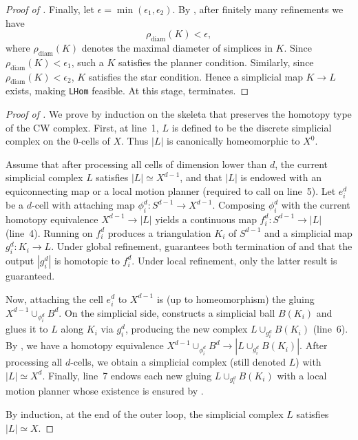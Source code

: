 \documentclass[a4paper,english,cleveref,autoref,thm-restate,nolineno]{socg-lipics-v2021}
\newcommand{\geomreal}[1] { |#1| } %
\begin{document}
\begin{proof}[Proof of ]
	Finally, let $\epsilon=\min(\epsilon_1,\epsilon_2)$.
	By , after finitely many refinements we have
	\[
	\rho_\mathrm{diam}(K)<\epsilon,
	\]
	where $\rho_\mathrm{diam}(K)$ denotes the maximal diameter of simplices in $K$.
	Since $\rho_\mathrm{diam}(K)<\epsilon_1$, such a $K$ satisfies the planner condition. Similarly, since $\rho_\mathrm{diam}(K)<\epsilon_2$, $K$ satisfies the star condition. 
	Hence a simplicial map $K\to L$ exists, making
	\texttt{LHom} feasible. At this stage,  terminates.
\end{proof}

\algorithmcorrect*

\begin{proof}[Proof of ]
	\label{proof:algorithmcorrect}
	We prove by induction on the skeleta that  preserves the homotopy type of the CW complex.
	First, at line~1, $L$ is defined to be the discrete simplicial complex on the $0$-cells of $X$.
	Thus $|L|$ is canonically homeomorphic to $X^0$.
	
	Assume that after processing all cells of dimension lower than $d$, the current simplicial complex $L$ satisfies $|L|\simeq X^{d-1}$, and that $|L|$ is endowed with an equiconnecting map or a local motion planner (required to call  on line~5).
	Let $e_i^d$ be a $d$-cell with attaching map $\phi_i^d\colon S^{d-1}\to X^{d-1}$.
	Composing $\phi_i^d$ with the current homotopy equivalence $X^{d-1}\to |L|$ yields a continuous map $f_i^d\colon S^{d-1}\to |L|$ (line~4).
	Running  on $f_i^d$ produces a triangulation $K_i$ of $S^{d-1}$ and a simplicial map $g_i^d\colon K_i\to L$.
	Under global refinement,  guarantees both termination of  and that the output $|g_i^d|$ is homotopic to $f_i^d$.
	Under local refinement, only the latter result is guaranteed.
		
	Now, attaching the cell $e_i^d$ to $X^{d-1}$ is (up to homeomorphism) the gluing $X^{d-1}\cup_{\phi_i^d} B^d$. 
	On the simplicial side,  constructs a simplicial ball $B(K_i)$ and glues it to $L$ along $K_i$ via $g_i^d$, producing the new complex $L\cup_{g_i^d} B(K_i)$ (line~6).
	By , we have a homotopy equivalence $X^{d-1}\cup_{\phi_i^d} B^d\to\geomreal{L\cup_{g_i^d} B(K_i)}$.
	After processing all $d$-cells, we obtain a simplicial complex (still denoted $L$) with $|L|\simeq X^d$.
	Finally, line~7 endows each new gluing $L\cup_{g_i^d} B(K_i)$ with a local motion planner whose existence is ensured by .
	
	By induction, at the end of the outer loop, the simplicial complex $L$ satisfies $|L|\simeq X$. 
\end{proof}

\fi
\end{document}

